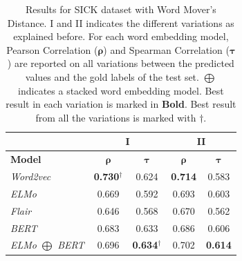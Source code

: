 \begin{enumerate}
\begin{table}[htb]
{\begin{tabular}{|l|cc|cc|}
			\hline & 
			\multicolumn{2}{c|}{\textbf{I}}    & \multicolumn{2}{c|}{\textbf{II}}   \\ 
			\hline
			\multicolumn{1}{|l|}{\textbf{Model}} 
			& $\bm{\rho}$   & $\bm{\tau}$     
			& $\bm{\rho}$   & $\bm{\tau}$  
			\\ \hline
			\textit{Word2vec}                  
			& \textbf{0.730}$^{\dagger}$  & 0.624        
			& \textbf{0.714}        & 0.583   \\
			\textit{ELMo}                     
			& 0.669                 & 0.592         
			& 0.693                 & 0.603    \\
			\textit{Flair}                     
			& 0.646                 & 0.568         
			& 0.670                 & 0.562    \\
			\textit{BERT}                     
			& 0.683                 & 0.633         
			& 0.686                 & 0.606  \\
			\textit{ELMo $\bigoplus$ BERT}                     
			& 0.696                 & \textbf{0.634}$^{\dagger}$          
			& 0.702                 & \textbf{0.614}  \\
			\hline
		\end{tabular}
	}
	\caption[Results for SICK with Word Mover's Distance]{Results for SICK dataset with Word Mover's Distance. I and II indicates the different variations as explained before. For each word embedding model, Pearson Correlation ($\bm{\rho}$) and Spearman Correlation ($\bm{\tau}$) are reported on all variations between the predicted values and the gold labels of the test set. $\bigoplus$ indicates a stacked word embedding model. Best result in each variation is marked in \textbf{Bold}. Best result from all the variations is marked with ${\dagger}$. }  
	\label{tab:sick_word_movers}
\end{table}

\begin{table}[htb]
	\centering
\end{table}
\end{enumerate}
